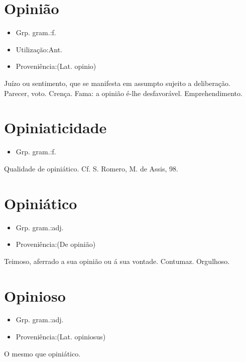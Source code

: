 \section{Opinião}
\begin{itemize}
\item {Grp. gram.:f.}
\end{itemize}
\begin{itemize}
\item {Utilização:Ant.}
\end{itemize}
\begin{itemize}
\item {Proveniência:(Lat. \textunderscore opinio\textunderscore )}
\end{itemize}
Juízo ou sentimento, que se manifesta em assumpto sujeito a deliberação.
Parecer, voto.
Crença.
Fama: \textunderscore a opinião é-lhe desfavorável\textunderscore .
Emprehendimento.
\section{Opiniaticidade}
\begin{itemize}
\item {Grp. gram.:f.}
\end{itemize}
Qualidade de opiniático. Cf. S. Romero, \textunderscore M. de Assis\textunderscore , 98.
\section{Opiniático}
\begin{itemize}
\item {Grp. gram.:adj.}
\end{itemize}
\begin{itemize}
\item {Proveniência:(De \textunderscore opinião\textunderscore )}
\end{itemize}
Teimoso, aferrado a sua opinião ou á sua vontade.
Contumaz.
Orgulhoso.
\section{Opinioso}
\begin{itemize}
\item {Grp. gram.:adj.}
\end{itemize}
\begin{itemize}
\item {Proveniência:(Lat. \textunderscore opiniosus\textunderscore )}
\end{itemize}
O mesmo que \textunderscore opiniático\textunderscore .
